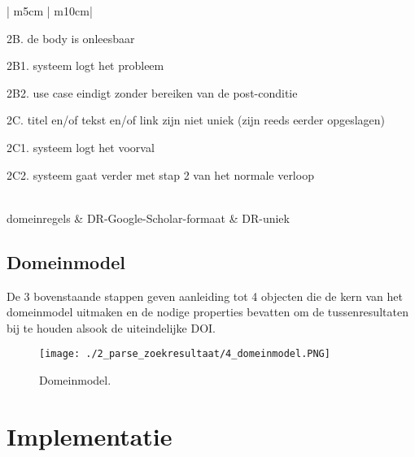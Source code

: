 \begin{table}[ptb]
\begin{tabular}{ | m{5cm} | m{10cm}| }
\begin{description}
            \item 2B. de body is onleesbaar
            \item 2B1. systeem logt het probleem
            \item 2B2. use case eindigt zonder bereiken van de post-conditie
            \item 2C. titel en/of tekst en/of link zijn niet uniek (zijn reeds eerder opgeslagen)
            \item 2C1. systeem logt het voorval
            \item 2C2. systeem gaat verder met stap 2 van het normale verloop
        \end{description} \\ 
        \hline
        domeinregels & DR-Google-Scholar-formaat
         & DR-uniek\\ 
        \hline
    \end{tabular}
    \caption{Table to test captions and labels.}
\end{table}

\subsection{Domeinmodel}
De 3 bovenstaande stappen geven aanleiding tot 4 objecten die de kern van het domeinmodel uitmaken en de nodige properties bevatten om de tussenresultaten bij te houden alsook de uiteindelijke DOI.
\begin{figure}
    \centering
    \texttt{[image: ./2\_parse\_zoekresultaat/4\_domeinmodel.PNG]}
    \caption[Domeinmodel.]{\label{fig:Domeinmodel}Domeinmodel.}
\end{figure}
\FloatBarrier
\section{Implementatie}
